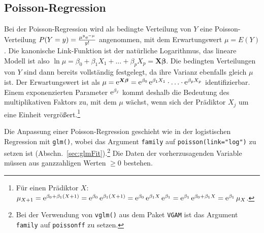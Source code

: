 \subsection{Poisson-Regression}
\label{sec:regrPoisson}

Bei der Poisson-Regression wird als bedingte Verteilung von $Y$ eine Poisson-Verteilung $P(Y=y) = \frac{\mu^{y} {\mathrm{e}}^{-\mu}}{y!}$ angenommen, mit dem Erwartungswert $\mu = E(Y)$. Die kanonische Link-Funktion ist der natürliche Logarithmus, das lineare Modell ist also $\ln \mu = \beta_{0} + \beta_{1} X_{1} + \dots + \beta_{p} X_{p} = \bm{X} \bm{\beta}$. Die bedingten Verteilungen von $Y$ sind dann bereits vollständig festgelegt, da ihre Varianz ebenfalls gleich $\mu$ ist. Der Erwartungswert ist als $\mu = {\mathrm{e}}^{\bm{X} \bm{\beta}} = {\mathrm{e}}^{\beta_{0}} \, {\mathrm{e}}^{\beta_{1} X_{1}} \cdot \ldots \cdot {\mathrm{e}}^{\beta_{p} X_{p}}$ identifizierbar. Einem exponenzierten Parameter ${\mathrm{e}}^{\beta_{j}}$ kommt deshalb die Bedeutung des multiplikativen Faktors zu, mit dem $\mu$ wächst, wenn sich der Prädiktor $X_{j}$ um eine Einheit vergrößert.\footnote{Für einen Prädiktor $X$: $\mu_{X+1} = {\mathrm{e}}^{\beta_{0} + \beta_{1} (X + 1)} = {\mathrm{e}}^{\beta_{0}} \, {\mathrm{e}}^{\beta_{1} (X + 1)} = {\mathrm{e}}^{\beta_{0}} \, {\mathrm{e}}^{\beta_{1} X} \, {\mathrm{e}}^{\beta_{1}} = {\mathrm{e}}^{\beta_{1}} \, {\mathrm{e}}^{\beta_{0} + \beta_{1} X} = {\mathrm{e}}^{\beta_{1}} \, \mu_{X}$.}

Die Anpassung einer Poisson-Regression geschieht wie in der logistischen Regression mit \lstinline!glm()!, wobei das Argument \lstinline!family! auf \lstinline!poisson(link="log")! zu setzen ist (Abschn.\ \ref{sec:glmFit}).\footnote{Bei der Verwendung von \lstinline!vglm()! aus dem Paket \lstinline!VGAM! ist das Argument \lstinline!family! auf \lstinline!poissonff! zu setzen.} Die Daten der vorherzusagenden Variable müssen aus ganzzahligen Werten $\geq 0$ bestehen.

